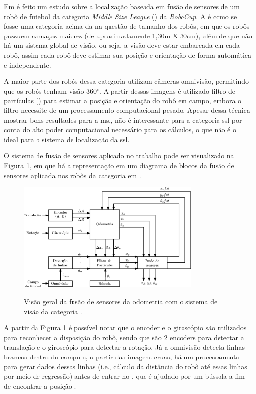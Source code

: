 \documentclass[acronym, symbols, table, deposito]{fei}
\begin{document}
Em \textcite{ismail2022soccer} é feito um estudo sobre a localização baseada em fusão de sensores de um robô de futebol da categoria \textit{Middle Size League} () da \textit{RoboCup}. A  é como se fosse uma categoria acima da  na questão de tamanho dos robôs, em que os robôs possuem carcaças maiores (de aproximadamente 1,30m X 30cm), além de que não há um sistema global de visão, ou seja, a visão deve estar embarcada em cada robô, assim cada robô deve estimar sua posição e orientação de forma automática e independente.

A maior parte dos robôs dessa categoria utilizam câmeras omnivisão, permitindo que os robôs tenham visão 360$^\circ$. A partir dessas imagens é utilizado filtro de partículas () para estimar a posição e orientação do robô em campo, embora o filtro necessite de um processamento computacional pesado. Apesar dessa técnica mostrar bons resultados para a \acrshort{msl}, não é interessante para a categoria \acrshort{ssl} por conta do alto poder computacional necessário para os cálculos, o que não é o ideal para o sistema de localização da \acrshort{ssl}.

O sistema de fusão de sensores aplicado no trabalho pode ser visualizado na Figura \ref{fig:msl_sensor_fusion}, em que há a representação em um diagrama de blocos da fusão de sensores aplicada nos robôs da categoria  em \textcite{ismail2022soccer}.

\begin{figure}[!htb]
	\centering
	\caption{Visão geral da fusão de sensores da odometria com o sistema de visão da categoria .} 
	\includegraphics[width=0.8\textwidth]{msl_sensor_fusion.eps}
	\label{fig:msl_sensor_fusion}
\end{figure}

A partir da Figura \ref{fig:msl_sensor_fusion} é possível notar que o encoder e o giroscópio são utilizados para reconhecer a disposição do robô, sendo que são 2 encoders para detectar a translação e o giroscópio para detectar a rotação. Já a omnivisão detecta linhas brancas dentro do campo e, a partir das imagens cruas, há um processamento para gerar dados dessas linhas (i.e., cálculo da distância do robô até essas linhas por meio de regressão) antes de entrar no , que é ajudado por um bússola a fim de encontrar a posição .
\end{document}
